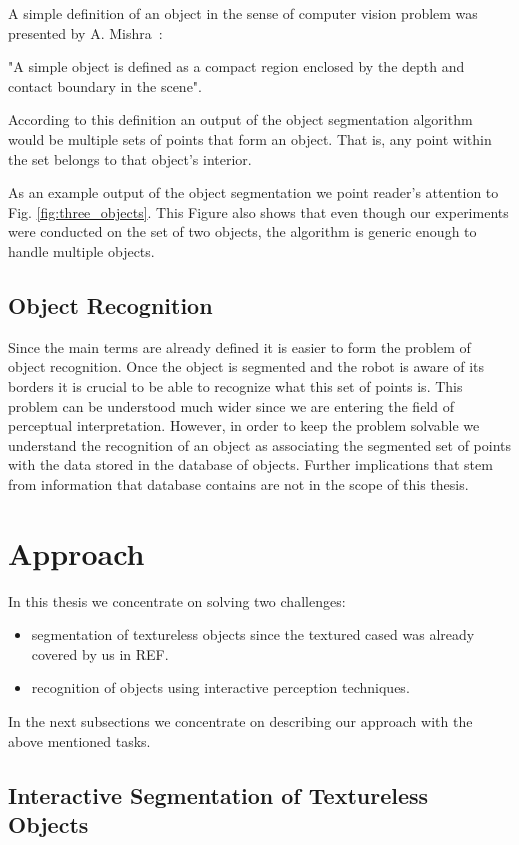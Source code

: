 A simple definition of an object in the sense of computer vision problem was presented by A. Mishra~\cite{mishra2012segmenting}:

"A simple object is defined as a compact region enclosed by the depth and
contact boundary in the scene".

According to this definition an output of the object segmentation algorithm would be multiple sets of points that form an object. That is, any point within the set belongs to that object's interior. 

As an example output of the object segmentation we point reader's attention to Fig. \ref{fig:three_objects}. This Figure also shows that even though our experiments were conducted on the set of two objects, the algorithm is generic enough to handle multiple objects. 

\subsection{Object Recognition}
Since the main terms are already defined it is easier to form the problem of object recognition. Once the object is segmented and the robot is aware of its borders it is crucial to be able to recognize what this set of points is. This problem can be understood much wider since we are entering the field of perceptual interpretation. However, in order to keep the problem solvable we understand the recognition of an object as associating the segmented set of points with the data stored in the database of objects. Further implications that stem from information that database contains are not in the scope of this thesis.

\section{Approach} 

In this thesis we concentrate on solving two challenges: 

\begin{itemize} 
\item segmentation of textureless objects since the textured cased was already covered by us in REF. 
\item recognition of objects using interactive perception techniques.
\end{itemize} 

In the next subsections we concentrate on describing our approach with the above mentioned tasks.

\subsection{Interactive Segmentation of Textureless Objects} 


